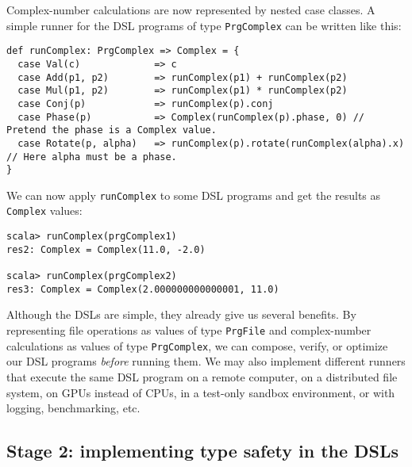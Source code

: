 Complex-number calculations are now represented by nested case classes.
A simple runner for the DSL programs of type \lstinline!PrgComplex!
can be written like this:
\begin{lstlisting}
def runComplex: PrgComplex => Complex = {
  case Val(c)             => c
  case Add(p1, p2)        => runComplex(p1) + runComplex(p2)
  case Mul(p1, p2)        => runComplex(p1) * runComplex(p2)
  case Conj(p)            => runComplex(p).conj
  case Phase(p)           => Complex(runComplex(p).phase, 0) // Pretend the phase is a Complex value.
  case Rotate(p, alpha)   => runComplex(p).rotate(runComplex(alpha).x) // Here alpha must be a phase.
}
\end{lstlisting}
We can now apply \lstinline!runComplex!
to some DSL programs and get the results as \lstinline!Complex!
values:
\begin{lstlisting}
scala> runComplex(prgComplex1)
res2: Complex = Complex(11.0, -2.0)

scala> runComplex(prgComplex2)
res3: Complex = Complex(2.000000000000001, 11.0)
\end{lstlisting}
Although the DSLs are simple, they already give us several benefits.
By representing file operations as values of type \lstinline!PrgFile!
and complex-number calculations as values of type \lstinline!PrgComplex!,
we can compose, verify, or optimize our DSL programs \emph{before}
running them. We may also implement different runners that execute
the same DSL program on a remote computer, on a distributed file system,
on GPUs instead of CPUs, in a test-only sandbox environment, or with
logging, benchmarking, etc.

\subsection{Stage 2: implementing type safety in the DSLs}

